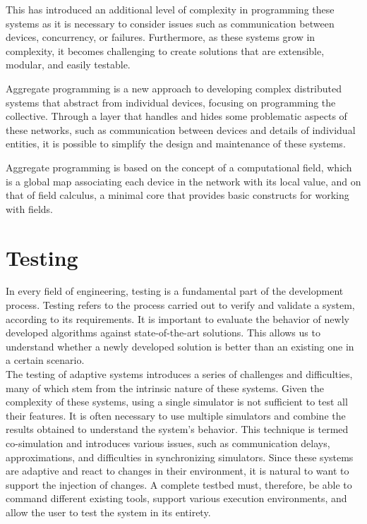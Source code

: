 \documentclass[12pt,a4paper,openright,twoside]{book}
\begin{document}
This has introduced an additional level of complexity in programming these systems as it is necessary to consider issues such as communication between devices,
concurrency, or failures. Furthermore, as these systems grow in complexity, it becomes challenging to create solutions that are extensible, modular, and easily testable. \cite{DBLP:conf/ecoop/CasadeiV16}

Aggregate programming is a new approach to developing complex distributed systems that abstract from individual devices, focusing on programming the collective.
Through a layer that handles and hides some problematic aspects of these networks, such as communication between devices and details of individual entities,
it is possible to simplify the design and maintenance of these systems. \cite{DBLP:journals/computer/BealPV15, DBLP:conf/sfm/BealV16}

Aggregate programming is based on the concept of a computational field, which is a global map associating each device in the network with its local value,
and on that of field calculus, a minimal core that provides basic constructs for working with fields. \cite{DBLP:journals/corr/ViroliADPB16}

\section{Testing}

In every field of engineering, testing is a fundamental part of the development process.
Testing refers to the process carried out to verify and validate a system, according to its requirements. \cite{Spillner2011}
It is important to evaluate the behavior of newly developed algorithms against state-of-the-art solutions.
This allows us to understand whether a newly developed solution is better than an existing one in a certain scenario. \\

The testing of adaptive systems introduces a series of challenges and difficulties, many of which stem from the intrinsic nature of these systems.
Given the complexity of these systems, using a single simulator is not sufficient to test all their features.
It is often necessary to use multiple simulators and combine the results obtained to understand the system's behavior.
This technique is termed co-simulation and introduces various issues, such as communication delays, approximations, and difficulties in synchronizing simulators. \cite{DBLP:journals/simpra/ThuleLGML19}
Since these systems are adaptive and react to changes in their environment, it is natural to want to support the injection of changes. \cite{DBLP:conf/icac/BrownHHLLSY04}
A complete testbed must, therefore, be able to command different existing tools, support various execution environments, and allow the user to test the system in its entirety.
\end{document}
